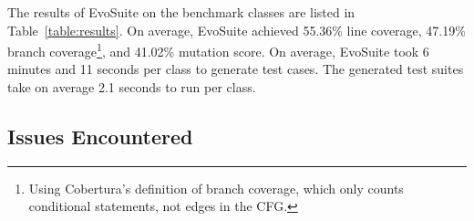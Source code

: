 \documentclass[10pt,conference,compsocconf]{IEEEtran}
\newcommand{\EVOSUITE}{{\sc EvoSuite}\xspace}
\begin{document}
\begin{table*}[t]
  \centering
  \caption{\label{table:results}Detailed results of \EVOSUITE on the SBST benchmark classes. Time is expressed in minutes.}
{}
\end{table*}


The results of \EVOSUITE on the benchmark classes are listed in
Table~\ref{table:results}. On average, \EVOSUITE achieved 55.36\% line
coverage, 47.19\% branch coverage\footnote{Using Cobertura's definition
  of branch coverage, which only counts conditional statements, not
  edges in the CFG.}, and 41.02\% mutation score. 
On average, \EVOSUITE took 6 minutes and 11 seconds per class to generate test cases. 
The generated test suites take on average 2.1 seconds to run per class. 


\subsection{Issues Encountered}

\end{document}

